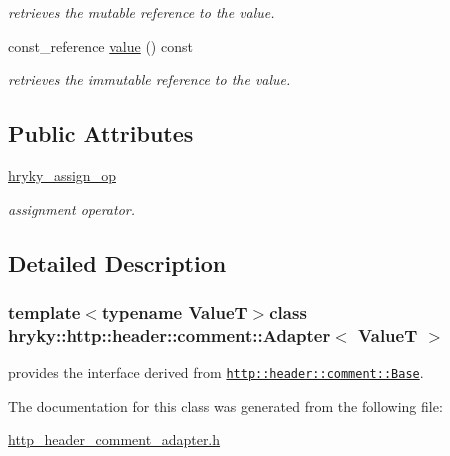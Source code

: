 \begin{DoxyCompactItemize}
\begin{DoxyCompactList}\small\item\em retrieves the mutable reference to the value. \end{DoxyCompactList}\item 
\hypertarget{classhryky_1_1_adapter_a5856f2ee6c0622e153f52fbb6ca6bbe9}{const\-\_\-reference \hyperlink{classhryky_1_1_adapter_a5856f2ee6c0622e153f52fbb6ca6bbe9}{value} () const}\label{classhryky_1_1_adapter_a5856f2ee6c0622e153f52fbb6ca6bbe9}

\begin{DoxyCompactList}\small\item\em retrieves the immutable reference to the value. \end{DoxyCompactList}\end{DoxyCompactItemize}
\subsection*{Public Attributes}
\begin{DoxyCompactItemize}
\item 
\hypertarget{classhryky_1_1_adapter_a764c5fe566545047f3acaf18792e5102}{\hyperlink{classhryky_1_1_adapter_a764c5fe566545047f3acaf18792e5102}{hryky\-\_\-assign\-\_\-op}}\label{classhryky_1_1_adapter_a764c5fe566545047f3acaf18792e5102}

\begin{DoxyCompactList}\small\item\em assignment operator. \end{DoxyCompactList}\end{DoxyCompactItemize}


\subsection{Detailed Description}
\subsubsection*{template$<$typename Value\-T$>$class hryky\-::http\-::header\-::comment\-::\-Adapter$<$ Value\-T $>$}

provides the interface derived from \href{http::header::comment::Base}{\tt http\-::header\-::comment\-::\-Base}. 

The documentation for this class was generated from the following file\-:\begin{DoxyCompactItemize}
\item 
\hyperlink{http__header__comment__adapter_8h}{http\-\_\-header\-\_\-comment\-\_\-adapter.\-h}\end{DoxyCompactItemize}
